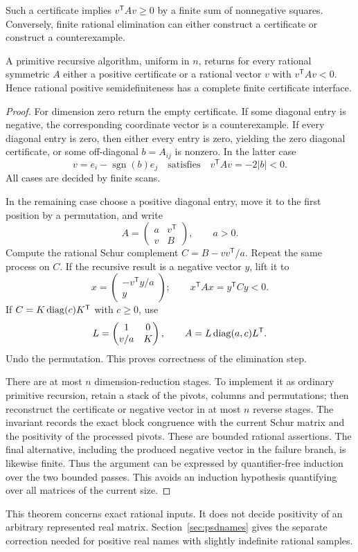 Such a certificate implies $v^{\mathsf T}Av\ge0$ by a finite sum of nonnegative squares. Conversely, finite rational elimination can either construct a certificate or construct a counterexample.

\begin{theorem}
\label{thm:ldl}
A primitive recursive algorithm, uniform in $n$, returns for every rational symmetric $A$ either a positive certificate or a rational vector $v$ with $v^{\mathsf T}Av<0$. Hence rational positive semidefiniteness has a complete finite certificate interface.
\end{theorem}
\begin{proof}
For dimension zero return the empty certificate. If some diagonal entry is negative, the corresponding coordinate vector is a counterexample. If every diagonal entry is zero, then either every entry is zero, yielding the zero diagonal certificate, or some off-diagonal $b=A_{ij}$ is nonzero. In the latter case
\[
 v=e_i-\operatorname{sgn}(b)e_j
 \quad\text{satisfies}\quad v^{\mathsf T}Av=-2|b|<0.
\]
All cases are decided by finite scans.

In the remaining case choose a positive diagonal entry, move it to the first position by a permutation, and write
\[
 A=\begin{pmatrix}a&v^{\mathsf T}\\v&B\end{pmatrix},\qquad a>0.
\]
Compute the rational Schur complement $C=B-vv^{\mathsf T}/a$. Repeat the same process on $C$. If the recursive result is a negative vector $y$, lift it to
\[
 x=\begin{pmatrix}-v^{\mathsf T}y/a\\y\end{pmatrix};
 \qquad x^{\mathsf T}Ax=y^{\mathsf T}Cy<0.
\]
If $C=K\operatorname{diag}(c)K^{\mathsf T}$ with $c\ge0$, use
\[
 L=\begin{pmatrix}1&0\\v/a&K\end{pmatrix},\qquad
 A=L\operatorname{diag}(a,c)L^{\mathsf T}.
\]
Undo the permutation. This proves correctness of the elimination step.

There are at most $n$ dimension-reduction stages. To implement it as ordinary primitive recursion, retain a stack of the pivots, columns and permutations; then reconstruct the certificate or negative vector in at most $n$ reverse stages. The invariant records the exact block congruence with the current Schur matrix and the positivity of the processed pivots. These are bounded rational assertions. The final alternative, including the produced negative vector in the failure branch, is likewise finite. Thus the argument can be expressed by quantifier-free induction over the two bounded passes. This avoids an induction hypothesis quantifying over all matrices of the current size.
\end{proof}

This theorem concerns exact rational inputs. It does not decide positivity of an arbitrary represented real matrix. Section~\ref{sec:psdnames} gives the separate correction needed for positive real names with slightly indefinite rational samples.

